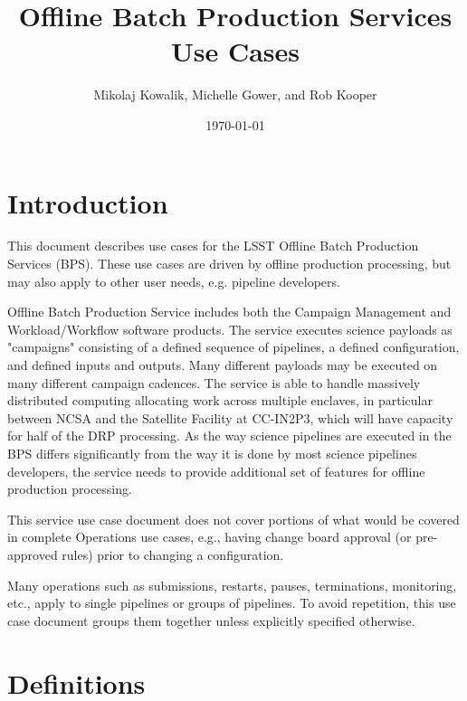 \documentclass[DM,lsstdraft,toc]{lsstdoc}
\title{Offline Batch Production Services Use Cases}
\author{Mikolaj Kowalik, Michelle Gower, and Rob Kooper}
\date{\today}
\begin{document}
\maketitle

\section{Introduction}

This document describes use cases for the LSST Offline Batch Production
Services (BPS).  These use cases are driven by offline production
processing, but may also apply to other user needs, e.g. pipeline
developers.

Offline Batch Production Service includes both the Campaign Management and
Workload/Workflow software products.  The service executes science payloads as
"campaigns" consisting of a defined sequence of pipelines, a defined
configuration, and defined inputs and outputs.  Many different payloads may be
executed on many different campaign cadences.  The service is able to handle
massively distributed computing allocating work across multiple enclaves, in
particular between NCSA and the Satellite Facility at CC-IN2P3, which will have
capacity for half of the DRP processing.  As the way science pipelines are
executed in the BPS differs significantly from the way it is done by most
science pipelines developers, the service needs to provide additional set of
features for offline production processing.

This service use case document does not cover portions of what would be
covered in complete Operations use cases, e.g., having change board
approval (or pre-approved rules) prior to changing a configuration.    

Many operations such as submissions, restarts, pauses, terminations,
monitoring, etc., apply to single pipelines or groups of pipelines.  To avoid
repetition, this use case document groups them together unless explicitly
specified otherwise.

\section{Definitions}
\end{document}
